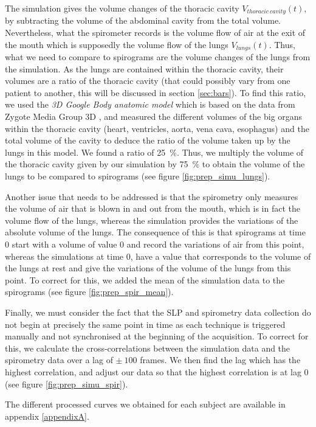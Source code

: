 The simulation gives the volume changes of the thoracic cavity $V_{thoracic~cavity}(t)$, by subtracting the volume of the abdominal cavity from the total volume. Nevertheless, what the spirometer records is the volume flow of air at the exit of the mouth which is supposedly the volume flow of the lungs $V_{lungs}(t)$. Thus, what we need to compare to spirograms are the volume changes of the lungs from the simulation. As the lungs are contained within the thoracic cavity, their volumes are a ratio of the thoracic cavity (that could possibly vary from one patient to another, this will be discussed in section \ref{sec:bars}). To find this ratio, we used the \emph{3D Google Body anatomic model} \cite{googlebody2011} which is based on the data from Zygote Media Group 3D \cite{zygote2011}, and measured the different volumes of the big organs within the thoracic cavity (heart, ventricles, aorta, vena cava, esophagus) and the total volume of the cavity to deduce the ratio of the volume taken up by the lungs in this model. We found a ratio of 25~\%. Thus, we multiply the volume of the thoracic cavity given by our simulation by 75~\% to obtain the volume of the lungs to be compared to spirograms (see figure \ref{fig:prep_simu_lungs}).

Another issue that needs to be addressed is that the spirometry only measures the volume of air that is blown in and out from the mouth, which is in fact the volume flow of the lungs, whereas the simulation provides the variations of the absolute volume of the lungs. The consequence of this is that spirograms at time 0 start with a volume of value 0 and record the variations of air from this point, whereas the simulations at time 0, have a value that corresponds to the volume of the lungs at rest and give the variations of the volume of the lungs from this point.
To correct for this, we added the mean of the simulation data to the spirograms (see figure \ref{fig:prep_spir_mean}).

Finally, we must consider the fact that the SLP and spirometry data collection do not begin at precisely the same point in time as each technique is triggered manually and not synchronised at the beginning of the acquisition. To correct for this, we calculate the cross-correlations between the simulation data and the spirometry data over a lag of $\pm~100$ frames. We then find the lag which has the highest correlation, and adjust our data so that the highest correlation is at lag 0 (see figure \ref{fig:prep_simu_spir}). 

The different processed curves we obtained for each subject are available in appendix \ref{appendixA}.

